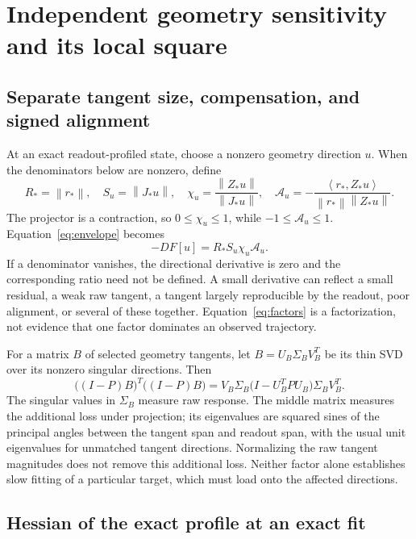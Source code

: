 \documentclass[11pt]{article}
\theoremstyle{remark}
\newcommand{\norm}[1]{\left\lVert #1\right\rVert}
\newcommand{\ip}[2]{\left\langle #1,#2\right\rangle}
\begin{document}
\section{Independent geometry sensitivity and its local square}
\subsection{Separate tangent size, compensation, and signed alignment}

At an exact readout-profiled state, choose a nonzero geometry direction $u$. When the denominators below are nonzero, define
\begin{equation}
 R_* = \norm{r_*},\quad S_u=\norm{J_*u},\quad
 \chi_u=\frac{\norm{Z_*u}}{\norm{J_*u}},\quad
 \mathcal A_u=-\frac{\ip{r_*}{Z_*u}}{\norm{r_*}\norm{Z_*u}}.
\end{equation}
The projector is a contraction, so $0\leq\chi_u\leq1$, while $-1\leq\mathcal A_u\leq1$. Equation~\eqref{eq:envelope} becomes
\begin{equation}
 -DF[u]=R_*S_u\chi_u\mathcal A_u.
 \label{eq:factors}
\end{equation}
If a denominator vanishes, the directional derivative is zero and the corresponding ratio need not be defined. A small derivative can reflect a small residual, a weak raw tangent, a tangent largely reproducible by the readout, poor alignment, or several of these together. Equation~\eqref{eq:factors} is a factorization, not evidence that one factor dominates an observed trajectory.

For a matrix $B$ of selected geometry tangents, let $B=U_B\Sigma_BV_B^T$ be its thin SVD over its nonzero singular directions. Then
\begin{equation}
 \bigl((I-P)B\bigr)^T\bigl((I-P)B\bigr)
 =V_B\Sigma_B\bigl(I-U_B^TPU_B\bigr)\Sigma_BV_B^T.
 \label{eq:compensation-matrix}
\end{equation}
The singular values in $\Sigma_B$ measure raw response. The middle matrix measures the additional loss under projection; its eigenvalues are squared sines of the principal angles between the tangent span and readout span, with the usual unit eigenvalues for unmatched tangent directions. Normalizing the raw tangent magnitudes does not remove this additional loss. Neither factor alone establishes slow fitting of a particular target, which must load onto the affected directions.

\subsection{Hessian of the exact profile at an exact fit}
\end{document}
